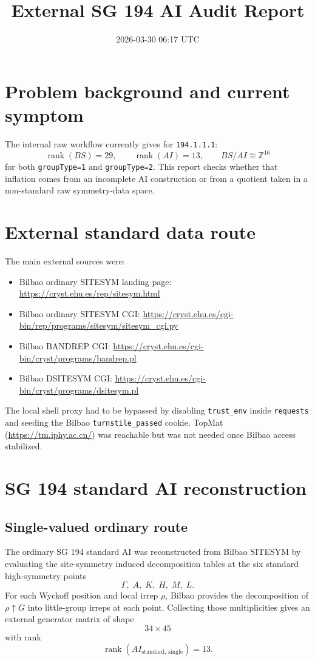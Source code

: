 \documentclass[11pt]{article}
\begin{document}
\title{External SG 194 AI Audit Report}
\date{2026-03-30 06:17 UTC}
\maketitle

\section{Problem background and current symptom}
The internal raw workflow currently gives for \texttt{194.1.1.1}:
\[
\operatorname{rank}(BS)=29,\qquad \operatorname{rank}(AI)=13,\qquad BS/AI \cong \mathbb{Z}^{16}
\]
for both \texttt{groupType=1} and \texttt{groupType=2}. This report checks whether that inflation comes from an incomplete AI construction or from a quotient taken in a non-standard raw symmetry-data space.

\section{External standard data route}
The main external sources were:
\begin{itemize}
\item Bilbao ordinary SITESYM landing page: \url{https://cryst.ehu.es/rep/sitesym.html}
\item Bilbao ordinary SITESYM CGI: \url{https://cryst.ehu.es/cgi-bin/rep/programs/sitesym/sitesym_cgi.py}
\item Bilbao BANDREP CGI: \url{https://cryst.ehu.es/cgi-bin/cryst/programs/bandrep.pl}
\item Bilbao DSITESYM CGI: \url{https://cryst.ehu.es/cgi-bin/cryst/programs/dsitesym.pl}
\end{itemize}
The local shell proxy had to be bypassed by disabling \texttt{trust\_env} inside \texttt{requests} and seeding the Bilbao \texttt{turnstile\_passed} cookie. TopMat (\url{https://tm.iphy.ac.cn/}) was reachable but was not needed once Bilbao access stabilized.

\section{SG 194 standard AI reconstruction}
\subsection{Single-valued ordinary route}
The ordinary SG 194 standard AI was reconstructed from Bilbao SITESYM by evaluating the site-symmetry induced decomposition tables at the six standard high-symmetry points
\[
\Gamma,\; A,\; K,\; H,\; M,\; L.
\]
For each Wyckoff position and local irrep $\rho$, Bilbao provides the decomposition of $\rho \uparrow G$ into little-group irreps at each point. Collecting those multiplicities gives an external generator matrix of shape
\[
34 \times 45
\]
with rank
\[
\operatorname{rank}(AI_{\mathrm{standard},\,\mathrm{single}}) = 13.
\]
\end{document}
